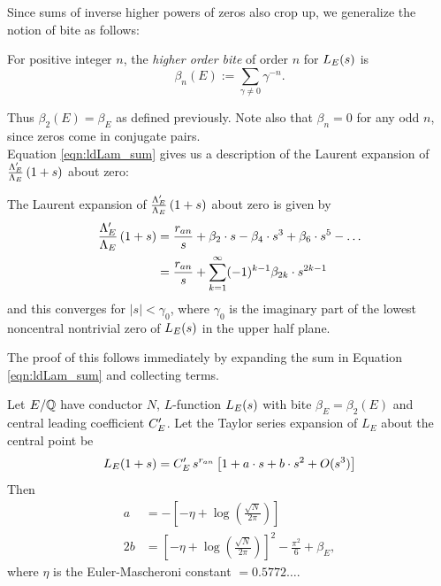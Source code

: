 Since sums of inverse higher powers of zeros also crop up, we generalize the notion of bite as follows:
\begin{definition}
For positive integer $n$, the {\it higher order bite} of order $n$ for $L_E(s)$ is
\begin{equation}
\beta_n(E) := \sum_{\gamma \ne 0} \gamma^{-n}.
\end{equation}
\end{definition}
Thus $\beta_2(E) = \beta_E$ as defined previously. Note also that $\beta_n = 0$ for any odd $n$, since zeros come in conjugate pairs. \\

Equation \ref{eqn:ldLam_sum} gives us a description of the Laurent expansion of $\frac{\Lambda_E^{\prime}}{\Lambda_E}\left(1+s\right)$ about zero:
\begin{corollary}\label{cor:ldLam_series_at_zero}
The Laurent expansion of $\frac{\Lambda_E^{\prime}}{\Lambda_E}\left(1+s\right)$ about zero is given by
\begin{align}
\frac{\Lambda_E^{\prime}}{\Lambda_E}\left(1+s\right) &= \frac{r_{an}}{s} + \beta_2\cdot s - \beta_4\cdot s^3 + \beta_6\cdot  s^5 - \ldots \\
& = \frac{r_{an}}{s} + \sum_{k=1}^{\infty} (-1)^{k-1}\beta_{2k}\cdot s^{2k-1}
\end{align}
and this converges for $|s|<\gamma_0$, where $\gamma_0$ is the imaginary part of the lowest noncentral nontrivial zero of $L_E(s)$ in the upper half plane.
\end{corollary}
The proof of this follows immediately by expanding the sum in Equation \ref{eqn:ldLam_sum} and collecting terms. \\

\begin{corollary}\label{cor:ldLe_expansion}
Let $E/\mathbb{Q}$ have conductor $N$, $L$-function $L_E(s)$ with bite $\beta_E = \beta_2(E)$ and central leading coefficient $C_E^{\prime}$. Let the Taylor series expansion of $L_E$ about the central point be
\begin{equation}
L_E(1+s) = C_E^{\prime} \, s^{r_{an}}\left[1 + a\cdot s + b\cdot s^2 + O(s^3)\right]
\end{equation}
Then 
\begin{align}
a &= -\left[-\eta + \log\left(\frac{\sqrt{N}}{2\pi}\right)\right] \\
2b &= \left[-\eta + \log\left(\frac{\sqrt{N}}{2\pi}\right)\right]^2 - \frac{\pi^2}{6} + \beta_E,
\end{align}
where $\eta$ is the Euler-Mascheroni constant $= 0.5772\ldots$.
\end{corollary}

